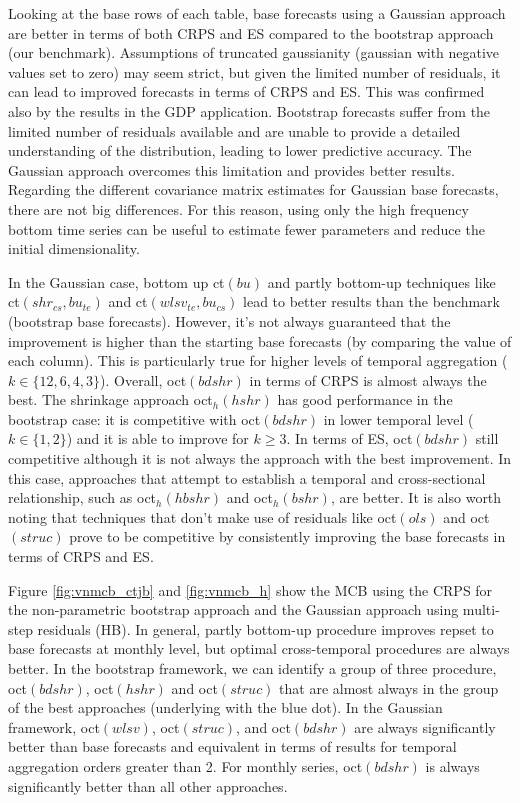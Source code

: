 \documentclass[a4paper,11pt]{article}
\theoremstyle{definition}
\begin{document}
Looking at the base rows of each table, base forecasts using a Gaussian approach are better in terms of both CRPS and ES compared to the bootstrap approach (our benchmark). Assumptions of truncated gaussianity (gaussian with negative values set to zero) may seem strict, but given the limited number of residuals, it can lead to improved forecasts in terms of CRPS and ES. This was confirmed also by the results in the GDP application. Bootstrap forecasts suffer from the limited number of residuals available and are unable to provide a detailed understanding of the distribution, leading to lower predictive accuracy. The Gaussian approach overcomes this limitation and provides better results. Regarding the different covariance matrix estimates for Gaussian base forecasts, there are not big differences. For this reason, using only the high frequency bottom time series can be useful to estimate fewer parameters and reduce the initial dimensionality. 

In the Gaussian case, bottom up ct$(bu)$ and partly bottom-up techniques like ct$(shr_{cs}, bu_{te})$ and ct$(wlsv_{te}, bu_{cs})$ lead to better results than the benchmark (bootstrap base forecasts). However, it's not always guaranteed that the improvement is higher than the starting base forecasts (by comparing the value of each column). This is particularly true for higher levels of temporal aggregation ($k \in \{12, 6, 4, 3\}$). Overall, oct$(bdshr)$ in terms of CRPS is almost always the best. The shrinkage approach oct$_h(hshr)$ has good performance in the bootstrap case: it is competitive with oct$(bdshr)$ in lower temporal level ($k \in \{1,2\}$) and it is able to improve for $k\ge 3$. In terms of ES, oct$(bdshr)$ still competitive although it is not always the approach with the best improvement. In this case, approaches that attempt to establish a temporal and cross-sectional relationship, such as oct$_h(hbshr)$ and oct$_h(bshr)$, are better. %
It is also worth noting that techniques that don't make use of residuals like oct$(ols)$ and oct$(struc)$ prove to be competitive by consistently improving the base forecasts in terms of CRPS and ES.


Figure \ref{fig:vnmcb_ctjb} and \ref{fig:vnmcb_h} show the MCB using the CRPS for the non-parametric bootstrap approach and the Gaussian approach using multi-step residuals (HB). In general, partly bottom-up procedure improves repset to base forecasts at monthly level, but optimal cross-temporal procedures are always better. In the bootstrap framework, we can identify a group of three procedure, oct$(bdshr)$, oct$(hshr)$ and oct$(struc)$ that are almost always in the group of the best approaches (underlying with the blue dot). In the Gaussian framework, oct$(wlsv)$, oct$(struc)$, and oct$(bdshr)$ are always significantly better than base forecasts and equivalent in terms of results for temporal aggregation orders greater than 2. For monthly series, oct$(bdshr)$ is always significantly better than all other approaches. 
\end{document}
